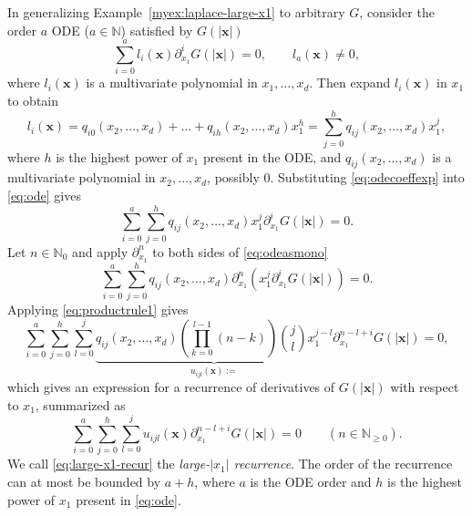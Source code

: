 \documentclass[12pt]{article}
\def\N{{\mathbb N}}
\let\b=\boldsymbol
\theoremstyle{definition}
\theoremstyle{plain}
\theoremstyle{definition}
\begin{document}
In generalizing Example~\ref{myex:laplace-large-x1} to arbitrary $G$, consider the order $a$ ODE ($a \in \N$) satisfied by $G(|{\b x}|)$
\begin{equation}
\label{eq:ode}
\sum_{i=0}^a l_i({\b x}) \partial^i_{x_1} G(|{\b x}|) = 0 , \qquad l_a(\b{x}) \ne 0,
\end{equation}
where $l_i({\b x})$ is a multivariate polynomial in $x_1, \dots, x_d$. Then expand $l_i(\b{x})$ in $x_1$ to obtain
\begin{equation}
\label{eq:odecoeffexp}
l_i({\b x}) = q_{i0}(x_2, \dots, x_d) + \dots +  q_{ih}(x_2, \dots, x_d) x_1^h = \sum_{j=0}^{h} q_{ij}(x_2, \dots, x_d) x_1^j,
\end{equation}
where 
$h$ is the highest power of $x_1$ present in the ODE, and $q_{ij}(x_2, \dots, x_d)$ is a multivariate polynomial in $x_2, \dots, x_d$, possibly 0. Substituting \eqref{eq:odecoeffexp} into \eqref{eq:ode} gives
\begin{equation}
\label{eq:odeasmono}
\sum_{i=0}^a  \sum_{j=0}^{h} q_{ij}(x_2, \dots, x_d) x_1^j \partial^i_{x_1} G(|{\b x}|) = 0.
\end{equation}
Let $n \in \N_0$ and apply $\partial^n_{x_1}$ to both sides of \eqref{eq:odeasmono}
\[
\sum_{i=0}^a  \sum_{j=0}^{h} q_{ij}(x_2, \dots, x_d) \partial^n_{x_1} \left( x_1^j \partial^i_{x_1} G(|{\b x}|) \right) = 0.
\]
Applying \eqref{eq:productrule1} gives
\begin{equation}
  \sum_{i=0}^a  \sum_{j=0}^{h} \sum_{l=0}^j
  \underbrace{q_{ij}(x_2, \dots, x_d) \left(\prod^{l-1}_{k=0}(n-k)\right) \binom{j}{l} x_1^{j-l}}_{u_{ijl}(\b x):=} \partial^{n-l+i}_{x_1} G(|{\b x}|)= 0,
\end{equation}
which gives an expression for a recurrence of derivatives of $G(|\b{x}|)$ with respect to $x_1$, summarized as
\begin{equation}
\label{eq:large-x1-recur}
\sum_{i=0}^a  \sum_{j=0}^{h}  \sum_{l=0}^j u_{ijl}(\b{x}) \partial^{n-l+i}_{x_1} G(|{\b x}|)= 0 \qquad  (n \in \N_{\geq 0}).
\end{equation}
We call \eqref{eq:large-x1-recur} the \emph{large-$|x_1|$ recurrence}. The order of the recurrence can at most be bounded by $a+h$, where $a$ is the ODE order and $h$ is the highest power of $x_1$ present in \eqref{eq:ode}. 

\end{document}
